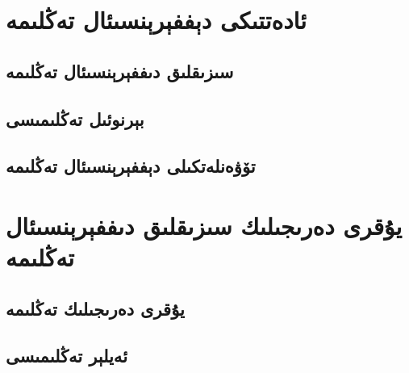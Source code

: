 \section{ئادەتتىكى دېففېرېنسىئال تەڭلىمە}
\subsection{سىزىقلىق دىففېرېنسىئال تەڭلىمە}
\subsection{بېرنوئىل تەڭلىمىسى}
\subsection{تۆۋەنلەتكىلى دېففېرېنسىئال تەڭلىمە}

\section{يۇقرى دەرىجىلىك سىزىقلىق دىففېرېنسىئال تەڭلىمە}
\subsection{يۇقرى دەرىجىلىك تەڭلىمە}
\subsection{ئەيلېر تەڭلىمىسى}


